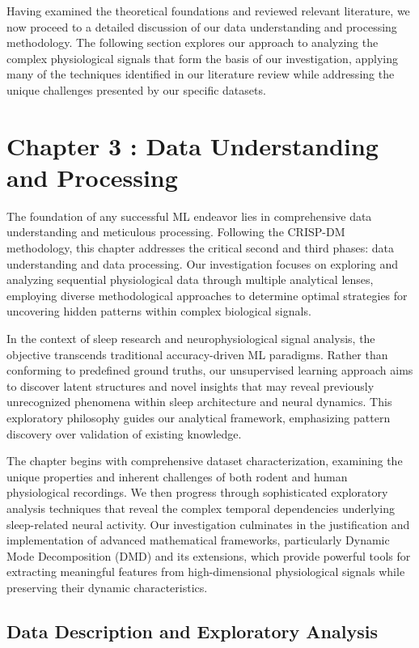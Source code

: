 \documentclass[a4paper,12pt,twoside]{article}
\begin{document}
Having examined the theoretical foundations and reviewed relevant literature, we now proceed to a detailed discussion of our data understanding and processing methodology. The following section explores our approach to analyzing the complex physiological signals that form the basis of our investigation, applying many of the techniques identified in our literature review while addressing the unique challenges presented by our specific datasets.


\section{Chapter 3 : Data Understanding and Processing}

The foundation of any successful ML endeavor lies in comprehensive data understanding and meticulous processing. Following the CRISP-DM methodology, this chapter addresses the critical second and third phases: data understanding and data processing. Our investigation focuses on exploring and analyzing sequential physiological data through multiple analytical lenses, employing diverse methodological approaches to determine optimal strategies for uncovering hidden patterns within complex biological signals.

In the context of sleep research and neurophysiological signal analysis, the objective transcends traditional accuracy-driven ML paradigms. Rather than conforming to predefined ground truths, our unsupervised learning approach aims to discover latent structures and novel insights that may reveal previously unrecognized phenomena within sleep architecture and neural dynamics. This exploratory philosophy guides our analytical framework, emphasizing pattern discovery over validation of existing knowledge.

The chapter begins with comprehensive dataset characterization, examining the unique properties and inherent challenges of both rodent and human physiological recordings. We then progress through sophisticated exploratory analysis techniques that reveal the complex temporal dependencies underlying sleep-related neural activity. Our investigation culminates in the justification and implementation of advanced mathematical frameworks, particularly Dynamic Mode Decomposition (DMD) and its extensions, which provide powerful tools for extracting meaningful features from high-dimensional physiological signals while preserving their dynamic characteristics.

\subsection{Data Description and Exploratory Analysis}
\end{document}
